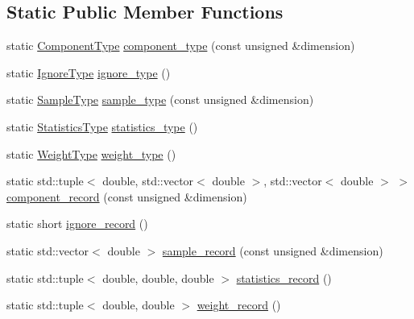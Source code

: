 \subsection*{Static Public Member Functions}
\begin{DoxyCompactItemize}
\item 
static \hyperlink{classeos_1_1hdf5_1_1Composite}{ComponentType} \hyperlink{structeos_1_1PopulationMonteCarloSampler_1_1Output_a89756e43d911fc21ca5e12e4f676c495}{component\_\-type} (const unsigned \&dimension)
\item 
static \hyperlink{classeos_1_1hdf5_1_1Scalar}{IgnoreType} \hyperlink{structeos_1_1PopulationMonteCarloSampler_1_1Output_a7dea0b1d53d47e5099fa97136a4f27a5}{ignore\_\-type} ()
\item 
static \hyperlink{classeos_1_1hdf5_1_1Array}{SampleType} \hyperlink{structeos_1_1PopulationMonteCarloSampler_1_1Output_ac9825b152fa3750d77cb7face4fbaf41}{sample\_\-type} (const unsigned \&dimension)
\item 
static \hyperlink{classeos_1_1hdf5_1_1Composite}{StatisticsType} \hyperlink{structeos_1_1PopulationMonteCarloSampler_1_1Output_ab943ce812be9756d846719e165f352a7}{statistics\_\-type} ()
\item 
static \hyperlink{classeos_1_1hdf5_1_1Composite}{WeightType} \hyperlink{structeos_1_1PopulationMonteCarloSampler_1_1Output_ad7a4912cebc0c3d00052a398aaef15dd}{weight\_\-type} ()
\item 
static std::tuple$<$ double, std::vector$<$ double $>$, std::vector$<$ double $>$ $>$ \hyperlink{structeos_1_1PopulationMonteCarloSampler_1_1Output_a55eed75bc734fdf74551769f1ef4f53a}{component\_\-record} (const unsigned \&dimension)
\item 
static short \hyperlink{structeos_1_1PopulationMonteCarloSampler_1_1Output_a0bc83ed4bd2ec948236eced9b6be6684}{ignore\_\-record} ()
\item 
static std::vector$<$ double $>$ \hyperlink{structeos_1_1PopulationMonteCarloSampler_1_1Output_a8091ae5b3a05edde2e076faafe0a02ab}{sample\_\-record} (const unsigned \&dimension)
\item 
static std::tuple$<$ double, double, double $>$ \hyperlink{structeos_1_1PopulationMonteCarloSampler_1_1Output_af58401b36b817e48635dfebfa54163e4}{statistics\_\-record} ()
\item 
static std::tuple$<$ double, double $>$ \hyperlink{structeos_1_1PopulationMonteCarloSampler_1_1Output_a6bcb392149e9b1f026f96d123f88d9d8}{weight\_\-record} ()
\end{DoxyCompactItemize}


